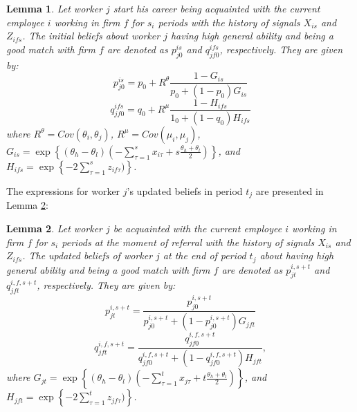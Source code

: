 \documentclass[12pt]{article}
\newtheorem{lemma}{Lemma}
\begin{document}
\begin{lemma}\label{lemma:init_beliefs_R}
Let worker $j$ start his career being acquainted with the current employee $i$ working in firm $f$ for $s_i$ periods with the history of signals $X_{is}$ and $Z_{ifs}$. The initial beliefs about worker $j$ having high general ability and being a good match with firm $f$ are denoted as $p_{j0}^{is}$ and $q_{jf0}^{ifs}$, respectively. They are given by:
    \begin{equation}\label{eq:p_j0_is}
    p_{j0}^{is} = p_0 + R^\theta \frac{1-G_{is}}{p_0 + (1-p_0)G_{is}}
    \end{equation}
    \begin{equation}
        q_{jf0}^{ifs} = q_0 + R^\mu \frac{1-H_{ifs}}{1_0 + (1-q_0)H_{ifs}}
    \end{equation}\label{eq:q_j0_is}
    where $R^\theta = Cov(\theta_i, \theta_j)$, $R^\mu = Cov(\mu_i, \mu_j)$, $G_{is} = \exp \left\lbrace (\theta_h - \theta_l)(-\sum_{\tau = 1}^{s}x_{i\tau} + s\frac{\theta_h + \theta_l}{2}) \right \rbrace$, and $H_{ifs} = \exp \left\lbrace -2\sum_{\tau = 1}^{s}z_{if\tau})\right\rbrace$.
\end{lemma}

The expressions for worker $j$'s updated beliefs in period $t_j$ are presented in Lemma \ref{lemma:upd_beliefs_R}:

\begin{lemma}\label{lemma:upd_beliefs_R}
    Let worker $j$ be acquainted with the current employee $i$ working in firm $f$ for $s_i$ periods at the moment of referral with the history of signals $X_{is}$ and $Z_{ifs}$. The updated beliefs of worker $j$ at the end of period $t_j$ about having high general ability and being a good match with firm $f$ are denoted as $p_{jt}^{i,s+t}$ and $q_{jft}^{i,f,s+t}$, respectively. They are given by:
    \begin{equation}\label{eq:p_jt_is+t}
        p_{jt}^{i,s+t} = \frac{p_{j0}^{i,s+t}}{p_{j0}^{i,s+t} + (1 - p_{j0}^{i,s+t})G_{jft}}
    \end{equation}
    \begin{equation}\label{eq:q_jt_is+t}
        q_{jft}^{i,f,s+t} = \frac{q_{jf0}^{i,f,s+t}}{q_{jf0}^{i,f,s+t} + (1- q_{jf0}^{i,f,s+t})H_{jft}},
    \end{equation}
    where $G_{jt} = \exp \left\lbrace (\theta_h - \theta_l)(-\sum_{\tau = 1}^{t}x_{j\tau} + t\frac{\theta_h + \theta_l}{2}) \right \rbrace$, and $H_{jft} = \exp \left\lbrace -2\sum_{\tau = 1}^{t}z_{jf\tau})\right\rbrace$.
\end{lemma}
\end{document}
